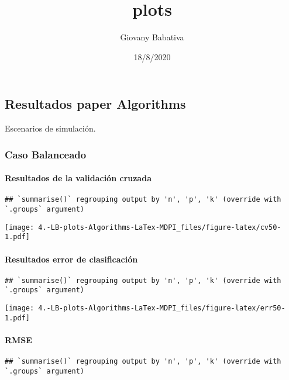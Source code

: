 \documentclass[
]{article}
\title{plots}
\author{Giovany Babativa}
\date{18/8/2020}
\begin{document}
\maketitle

\hypertarget{resultados-paper-algorithms}{%
\subsection{Resultados paper
Algorithms}\label{resultados-paper-algorithms}}

Escenarios de simulación.

\hypertarget{caso-balanceado}{%
\subsubsection{Caso Balanceado}\label{caso-balanceado}}

\hypertarget{resultados-de-la-validaciuxf3n-cruzada}{%
\paragraph{Resultados de la validación
cruzada}\label{resultados-de-la-validaciuxf3n-cruzada}}

\begin{verbatim}
## `summarise()` regrouping output by 'n', 'p', 'k' (override with `.groups` argument)
\end{verbatim}

\texttt{[image: 4.-LB-plots-Algorithms-LaTex-MDPI\_files/figure-latex/cv50-1.pdf]}

\hypertarget{resultados-error-de-clasificaciuxf3n}{%
\paragraph{Resultados error de
clasificación}\label{resultados-error-de-clasificaciuxf3n}}

\begin{verbatim}
## `summarise()` regrouping output by 'n', 'p', 'k' (override with `.groups` argument)
\end{verbatim}

\texttt{[image: 4.-LB-plots-Algorithms-LaTex-MDPI\_files/figure-latex/err50-1.pdf]}

\hypertarget{rmse}{%
\paragraph{RMSE}\label{rmse}}

\begin{verbatim}
## `summarise()` regrouping output by 'n', 'p', 'k' (override with `.groups` argument)
\end{verbatim}
\end{document}
